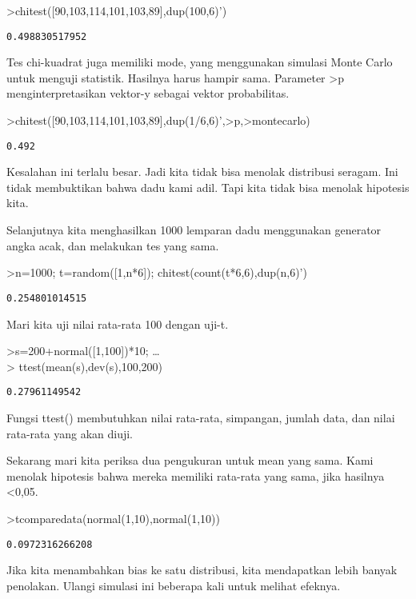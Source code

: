 \documentclass[
]{book}
\begin{document}
\textgreater chitest({[}90,103,114,101,103,89{]},dup(100,6)')

\begin{verbatim}
0.498830517952
\end{verbatim}

Tes chi-kuadrat juga memiliki mode, yang menggunakan simulasi Monte Carlo untuk menguji statistik. Hasilnya harus hampir sama. Parameter \textgreater p menginterpretasikan vektor-y sebagai vektor probabilitas.

\textgreater chitest({[}90,103,114,101,103,89{]},dup(1/6,6)',\textgreater p,\textgreater montecarlo)

\begin{verbatim}
0.492
\end{verbatim}

Kesalahan ini terlalu besar. Jadi kita tidak bisa menolak distribusi seragam. Ini tidak membuktikan bahwa dadu kami adil. Tapi kita tidak bisa menolak hipotesis kita.

Selanjutnya kita menghasilkan 1000 lemparan dadu menggunakan generator angka acak, dan melakukan tes yang sama.

\textgreater n=1000; t=random({[}1,n*6{]}); chitest(count(t*6,6),dup(n,6)')

\begin{verbatim}
0.254801014515
\end{verbatim}

Mari kita uji nilai rata-rata 100 dengan uji-t.

\textgreater s=200+normal({[}1,100{]})*10; \ldots{}\\
\textgreater{} ttest(mean(s),dev(s),100,200)

\begin{verbatim}
0.27961149542
\end{verbatim}

Fungsi ttest() membutuhkan nilai rata-rata, simpangan, jumlah data, dan nilai rata-rata yang akan diuji.

Sekarang mari kita periksa dua pengukuran untuk mean yang sama. Kami menolak hipotesis bahwa mereka memiliki rata-rata yang sama, jika hasilnya \textless0,05.

\textgreater tcomparedata(normal(1,10),normal(1,10))

\begin{verbatim}
0.0972316266208
\end{verbatim}

Jika kita menambahkan bias ke satu distribusi, kita mendapatkan lebih banyak penolakan. Ulangi simulasi ini beberapa kali untuk melihat efeknya.
\end{document}
